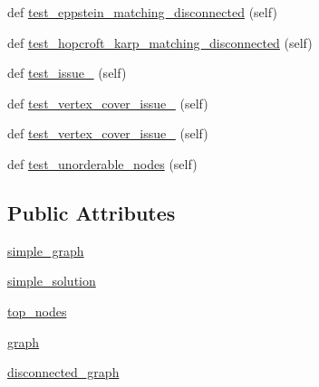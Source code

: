 \begin{DoxyCompactItemize}
\item 
def \hyperlink{classnetworkx_1_1algorithms_1_1bipartite_1_1tests_1_1test__matching_1_1TestMatching_af93aabba1d3d748c4f895ec5dff15d74}{test\+\_\+eppstein\+\_\+matching\+\_\+disconnected} (self)
\item 
def \hyperlink{classnetworkx_1_1algorithms_1_1bipartite_1_1tests_1_1test__matching_1_1TestMatching_a3c2044f0790324b977ad20cdd94e6d14}{test\+\_\+hopcroft\+\_\+karp\+\_\+matching\+\_\+disconnected} (self)
\item 
def \hyperlink{classnetworkx_1_1algorithms_1_1bipartite_1_1tests_1_1test__matching_1_1TestMatching_a470d94efaf1d33b49b9935a8b56d1495}{test\+\_\+issue\+\_} (self)
\item 
def \hyperlink{classnetworkx_1_1algorithms_1_1bipartite_1_1tests_1_1test__matching_1_1TestMatching_af6cf1fcf7d6206218d5fa4a5f9d5488a}{test\+\_\+vertex\+\_\+cover\+\_\+issue\+\_} (self)
\item 
def \hyperlink{classnetworkx_1_1algorithms_1_1bipartite_1_1tests_1_1test__matching_1_1TestMatching_adeb425405af46cd734459d532f1cd89a}{test\+\_\+vertex\+\_\+cover\+\_\+issue\+\_} (self)
\item 
def \hyperlink{classnetworkx_1_1algorithms_1_1bipartite_1_1tests_1_1test__matching_1_1TestMatching_ab8bb96045abba562702c5a6aa607f5ba}{test\+\_\+unorderable\+\_\+nodes} (self)
\end{DoxyCompactItemize}
\subsection*{Public Attributes}
\begin{DoxyCompactItemize}
\item 
\hyperlink{classnetworkx_1_1algorithms_1_1bipartite_1_1tests_1_1test__matching_1_1TestMatching_aaec4b39f557ca1b6acac8df39875a1d8}{simple\+\_\+graph}
\item 
\hyperlink{classnetworkx_1_1algorithms_1_1bipartite_1_1tests_1_1test__matching_1_1TestMatching_ac1bd51f0ab523955a6bbd3fb2167e96f}{simple\+\_\+solution}
\item 
\hyperlink{classnetworkx_1_1algorithms_1_1bipartite_1_1tests_1_1test__matching_1_1TestMatching_afd21c3230ca4a579d8bb99afa695b032}{top\+\_\+nodes}
\item 
\hyperlink{classnetworkx_1_1algorithms_1_1bipartite_1_1tests_1_1test__matching_1_1TestMatching_a3500d5d2e955272b02d1691bde6ee8ab}{graph}
\item 
\hyperlink{classnetworkx_1_1algorithms_1_1bipartite_1_1tests_1_1test__matching_1_1TestMatching_a00c37734622cb7e919507ba08a9a652a}{disconnected\+\_\+graph}
\end{DoxyCompactItemize}


